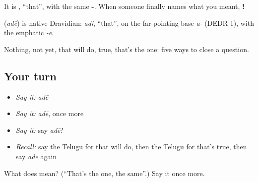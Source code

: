 It is \textbf{}, \textquotedblleft{}that\textquotedblright{}, with the same \textbf{-}. When someone finally names what you meant, \textbf{!}

\begin{cousinweb}
\textbf{} (\emph{adē}) is native Dravidian: \emph{adi}, \textquotedblleft{}that\textquotedblright{}, on the far-pointing base \emph{a-} (DEDR 1), with the emphatic \emph{-ē}.
\end{cousinweb}

\begin{grammarlens}[title={What you've built}]
Nothing, not yet, that will do, true, that's the one: five ways to close a question.
\end{grammarlens}

\subsection*{Your turn}
\begin{itemize}
\raggedright
  \item \emph{Say it:} \emph{adē}
  \item \emph{Say it:} \emph{adē}, once more
  \item \emph{Say it:} say \emph{adē!}
  \item \emph{Recall:} say the Telugu for that will do, then the Telugu for that's true, then say \emph{adē} again
\end{itemize}

\begin{tcolorbox}[breakable,colback=teal!4,colframe=teal!35!black,title={Before you move on}]
What does  mean? (\textquotedblleft{}That's the one, the same\textquotedblright{}.) Say it once more.
\end{tcolorbox}
